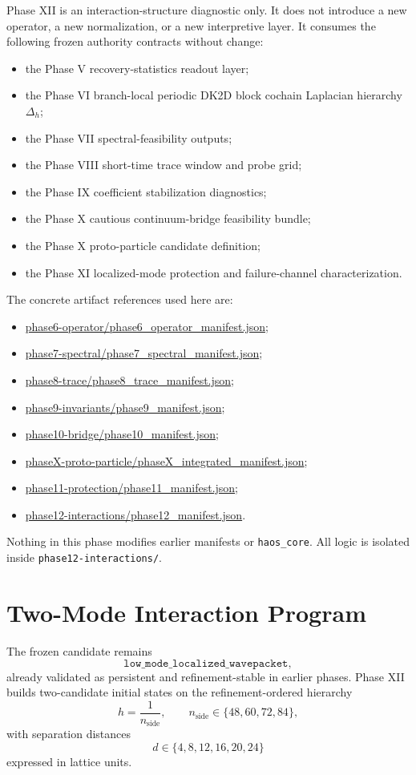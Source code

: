 \documentclass[11pt]{article}
\begin{document}
Phase XII is an interaction-structure diagnostic only. It does not introduce a new operator, a new normalization, or a new interpretive layer. It consumes the following frozen authority contracts without change:
\begin{itemize}
\item the Phase V recovery-statistics readout layer;
\item the Phase VI branch-local periodic DK2D block cochain Laplacian hierarchy $\Delta_h$;
\item the Phase VII spectral-feasibility outputs;
\item the Phase VIII short-time trace window and probe grid;
\item the Phase IX coefficient stabilization diagnostics;
\item the Phase X cautious continuum-bridge feasibility bundle;
\item the Phase X proto-particle candidate definition;
\item the Phase XI localized-mode protection and failure-channel characterization.
\end{itemize}

The concrete artifact references used here are:
\begin{itemize}
\item \url{phase6-operator/phase6_operator_manifest.json};
\item \url{phase7-spectral/phase7_spectral_manifest.json};
\item \url{phase8-trace/phase8_trace_manifest.json};
\item \url{phase9-invariants/phase9_manifest.json};
\item \url{phase10-bridge/phase10_manifest.json};
\item \url{phaseX-proto-particle/phaseX_integrated_manifest.json};
\item \url{phase11-protection/phase11_manifest.json};
\item \url{phase12-interactions/phase12_manifest.json}.
\end{itemize}

Nothing in this phase modifies earlier manifests or \texttt{haos\_core}. All logic is isolated inside \texttt{phase12-interactions/}.

\section{Two-Mode Interaction Program}

The frozen candidate remains
\[
\texttt{low\_mode\_localized\_wavepacket},
\]
already validated as persistent and refinement-stable in earlier phases. Phase XII builds two-candidate initial states on the refinement-ordered hierarchy
\[
h = \frac{1}{n_{\mathrm{side}}},
\qquad
n_{\mathrm{side}} \in \{48,60,72,84\},
\]
with separation distances
\[
d \in \{4,8,12,16,20,24\}
\]
expressed in lattice units.
\end{document}
